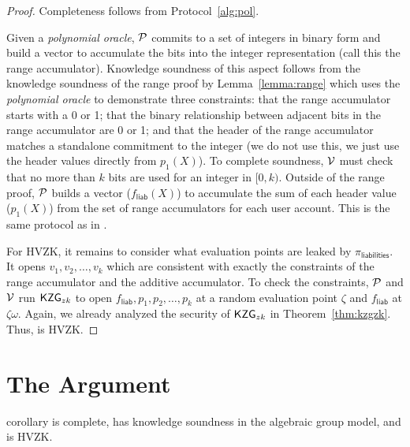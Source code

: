 \begin{proof}
Completeness follows from Protocol~\ref{alg:pol}. 

Given a \textit{polynomial oracle}, $\mathcal{P}$ commits to a set of integers in binary form and build a vector to accumulate the bits into the integer representation (call this the range accumulator). Knowledge soundness of this aspect follows from the knowledge soundness of the range proof by Lemma~\ref{lemma:range} which uses the \textit{polynomial oracle} to demonstrate three constraints: that the range accumulator starts with a 0 or 1; that the binary relationship between adjacent bits in the range accumulator are 0 or 1; and that the header of the range accumulator matches a standalone commitment to the integer (we do not use this, we just use the header values directly from $p_1(X)$). To complete soundness, $\mathcal{V}$ must check that no more than $k$ bits are used for an integer in $[0,k)$. Outside of the range proof, $\mathcal{P}$ builds a vector ($f_\mathsf{liab}(X)$) to accumulate the sum of each header value ($p_1(X)$) from the set of range accumulators for each user account. This is the same protocol as in \poa. 

For HVZK, it remains to consider what evaluation points are leaked by $\pi_\mathsf{liabilities}$. It opens $v_1,v_2,\dots,v_k$ which are consistent with exactly the constraints of the range accumulator and the additive accumulator. To check the constraints, $\mathcal{P}$ and $\mathcal{V}$ run $\mathsf{KZG}_{zk}$ to open $f_\mathsf{liab},p_1,p_2,\dots,p_k$ at a random evaluation point $\zeta$ and $f_\mathsf{liab}$ at $\zeta\omega$. Again, we already analyzed the security of $\mathsf{KZG}_{zk}$ in Theorem~\ref{thm:kzgzk}. Thus, \pol is HVZK.
\end{proof}


\section{The \userproof Argument}

\begin{restatable}{corollary}{}
\label{thm:users} 
\userproof is complete, has knowledge soundness in the algebraic group model, and is HVZK. 
\end{restatable}

